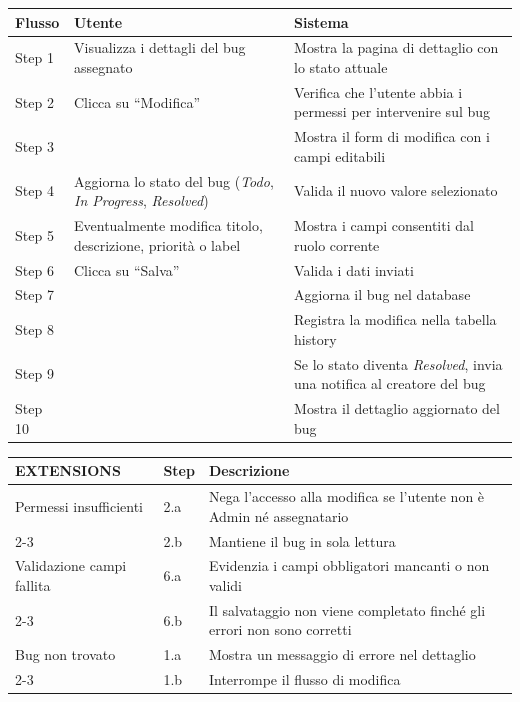 ﻿\documentclass[a4paper,11pt]{article}
\begin{document}
\begin{tabular}{|p{2cm}|p{5.5cm}|p{6.5cm}|}
\hline
\textbf{Flusso} & \textbf{Utente} & \textbf{Sistema} \\
\hline
Step 1 & Visualizza i dettagli del bug assegnato & Mostra la pagina di dettaglio con lo stato attuale \\
\hline
Step 2 & Clicca su ``Modifica'' & Verifica che l'utente abbia i permessi per intervenire sul bug \\
\hline
Step 3 & & Mostra il form di modifica con i campi editabili \\
\hline
Step 4 & Aggiorna lo stato del bug (\emph{Todo}, \emph{In Progress}, \emph{Resolved}) & Valida il nuovo valore selezionato \\
\hline
Step 5 & Eventualmente modifica titolo, descrizione, priorit\`a o label & Mostra i campi consentiti dal ruolo corrente \\
\hline
Step 6 & Clicca su ``Salva'' & Valida i dati inviati \\
\hline
Step 7 & & Aggiorna il bug nel database \\
\hline
Step 8 & & Registra la modifica nella tabella history \\
\hline
Step 9 & & Se lo stato diventa \emph{Resolved}, invia una notifica al creatore del bug \\
\hline
Step 10 & & Mostra il dettaglio aggiornato del bug \\
\hline
\end{tabular}

\vspace{0.5cm}

\begin{tabular}{|p{3cm}|p{1.5cm}|p{9.5cm}|}
\hline
\textbf{EXTENSIONS} & \textbf{Step} & \textbf{Descrizione} \\
\hline
Permessi insufficienti & 2.a & Nega l'accesso alla modifica se l'utente non \`e Admin n\'e assegnatario \\
\cline{2-3}
 & 2.b & Mantiene il bug in sola lettura \\
\hline
Validazione campi fallita & 6.a & Evidenzia i campi obbligatori mancanti o non validi \\
\cline{2-3}
 & 6.b & Il salvataggio non viene completato finch\'e gli errori non sono corretti \\
\hline
Bug non trovato & 1.a & Mostra un messaggio di errore nel dettaglio \\
\cline{2-3}
 & 1.b & Interrompe il flusso di modifica \\
\hline
\end{tabular}
\end{document}
